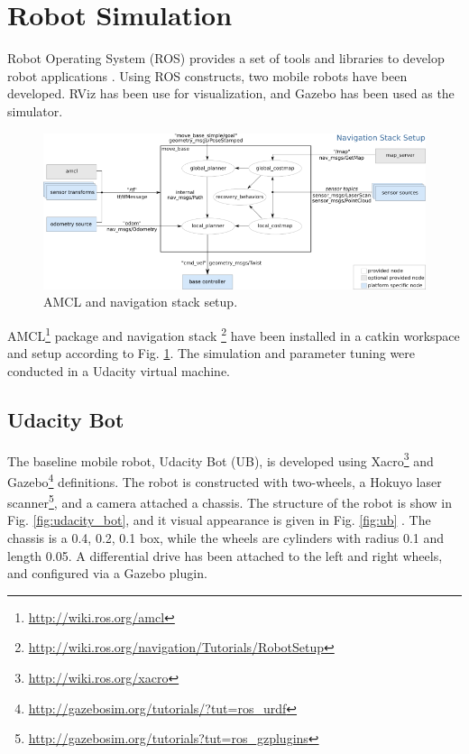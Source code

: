 \documentclass[10pt,journal,compsoc]{IEEEtran}
\begin{document}
\section{Robot Simulation}

Robot Operating System (ROS) provides a set of tools and libraries to develop robot applications \cite{288}. Using ROS constructs, two mobile robots have been developed.  RViz has been use for visualization, and Gazebo has been used as the simulator. 

\begin{figure}[thpb]
      \centering
      \includegraphics[width=\linewidth]{misc/overview_tf_small.png}
      \caption{AMCL and navigation stack setup.}
      \label{fig:nav_stack}
\end{figure}

AMCL\footnote{\url{http://wiki.ros.org/amcl}} package and navigation stack \footnote{\url{http://wiki.ros.org/navigation/Tutorials/RobotSetup}} have been installed in a catkin workspace and setup according to Fig. \ref{fig:nav_stack}. The simulation and parameter tuning were conducted in a Udacity virtual machine.

\subsection{Udacity Bot}
\label{subsec:udacity_bot}

The baseline mobile robot, Udacity Bot (UB), is developed using Xacro\footnote{\url{http://wiki.ros.org/xacro}} and Gazebo\footnote{\url{http://gazebosim.org/tutorials/?tut=ros_urdf}} definitions. The robot is constructed  with two-wheels, a Hokuyo laser scanner\footnote{\url{http://gazebosim.org/tutorials?tut=ros_gzplugins}}, and a camera attached a chassis. The structure of the robot is show in Fig. \ref{fig:udacity_bot}, and it visual appearance is given in Fig. \ref{fig:ub}  . The chassis is a 0.4, 0.2, 0.1 box, while the wheels are cylinders with radius 0.1 and length 0.05.  A differential drive has been attached to the left and right wheels, and configured via a Gazebo plugin. 
\end{document}
